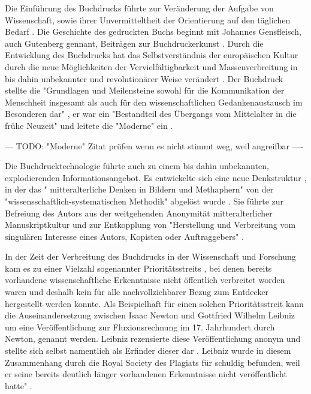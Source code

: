 Die Einführung des Buchdrucks führte zur Veränderung der Aufgabe von Wissenschaft, sowie ihrer Unvermitteltheit der Orientierung auf den täglichen Bedarf \cite{Luhmann1998}. Die Geschichte des gedruckten Buchs beginnt mit Johannes Gensfleisch, auch Gutenberg gennant, Beiträgen zur Buchdruckerkunst \cite{wittmann_1999_geschichte}. Durch die Entwicklung des Buchdrucks hat das Selbstverständnis der europäischen Kultur durch die neue Möglichkeiten der Vervielfältigbarkeit und Massenverbreitung in bis dahin unbekannter \cite{giesecke_1991_buchdruck} und revolutionärer Weise verändert \cite{wunderlich_2008_buchdruck}. Der Buchdruck stellte die "Grundlagen und Meilensteine sowohl für die Kommunikation der Menschheit insgesamt als auch für den wissenschaftlichen Gedankenaustausch im Besonderen dar" \cite{schirmbacher_2009_wisspub}, er war ein "Bestandteil des Übergangs vom Mittelalter in die frühe Neuzeit" \cite{lange2008medienwettbewerb} und leitete die "Moderne" ein \cite{luhmann_1997_gesellschaft}.

--- TODO: "Moderne" Zitat prüfen wenn es nicht stimmt weg, weil angreifbar ----

Die Buchdrucktechnologie führte auch zu einem bis dahin unbekannten, explodierenden Informationsangebot. Es entwickelte sich eine neue Denkstruktur \cite{eisenstein_1997_druckerpresse}, in der das " mitteralterliche Denken in Bildern und Methaphern" von der "wissensschaftlich-systematischen Methodik" abgelöst wurde \cite{wunderlich_2008_buchdruck}. Sie führte zur Befreiung des Autors aus der weitgehenden Anonymität mitteralterlicher Manuskriptkultur und zur Entkopplung von "Herstellung und Verbreitung vom singulären Interesse eines Autors, Kopisten oder Auftraggebers"\cite{wunderlich_2008_buchdruck} \cite{schirmbacher_2009_wisspub}.

In der Zeit der Verbreitung des Buchdrucks in der Wissenschaft und Forschung kam es zu einer Vielzahl sogenannter Prioritätsstreits \cite{schirmbacher_2009_wisspub}, bei denen bereits vorhandene wissenschaftliche Erkenntnisse nicht öffentlich verbreitet worden waren und deshalb kein für alle nachvollziehbarer Bezug zum Entdecker hergestellt werden konnte. Als Beispielhaft für einen solchen Prioritätsstreit kann die Auseinandersetzung zwischen Isaac Newton und Gottfried Wilhelm Leibniz um eine Veröffentlichung zur Fluxionsrechnung im 17. Jahrhundert durch Newton, genannt werden. Leibniz rezensierte diese Veröffentlichung anonym und stellte sich selbst namentlich als Erfinder dieser dar \cite{2013_leibniz}. Leibniz wurde in diesem Zusammenhang durch die Royal Society des Plagiats für schuldig befunden, weil er seine bereits deutlich länger vorhandenen Erkenntnisse nicht veröffentlicht hatte" \cite{schirmbacher_2009_wisspub}.

